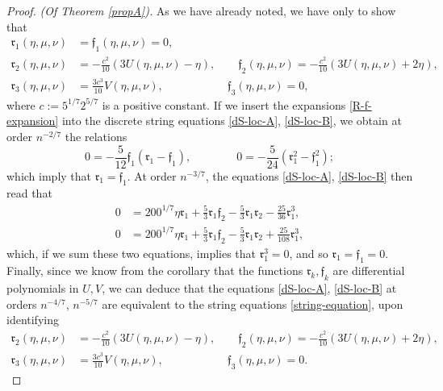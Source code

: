 \documentclass[usenames,dvipsnames]{article}
\theoremstyle{definition}
\numberwithin{equation}{section}
\numberwithin{figure}{section}
\begin{document}
\begin{proof}\textit{(Of Theorem \ref{propA}).}
As we have already noted, we have only to show that
                \begin{align*}
                    \mathfrak{r}_{1}(\eta,\mu,\nu) &= \mathfrak{f}_{1}(\eta,\mu,\nu) = 0,\\
                    \mathfrak{r}_{2}(\eta,\mu,\nu) &= -\frac{c^2}{10}\left(3U(\eta,\mu,\nu)-\eta\right),\qquad \mathfrak{f}_{2}(\eta,\mu,\nu) =  -\frac{c^2}{10}\left(3U(\eta,\mu,\nu)+2\eta\right),\\
                    \mathfrak{r}_{3}(\eta,\mu,\nu) &= \frac{3c^3}{10}V(\eta,\mu,\nu),\qquad\quad\,\,\,\,\qquad \mathfrak{f}_{3}(\eta,\mu,\nu) = 0,
                \end{align*}
where $c:=5^{1/7}2^{5/7}$ is a positive constant. If we insert the expansions \eqref{R-f-expansion} into the discrete string equations \eqref{dS-loc-A},
\eqref{dS-loc-B}, we obtain at order $n^{-2/7}$ the relations
    \begin{equation*}
        0  = -\frac{5}{12}\mathfrak{f}_1(\mathfrak{r}_1-\mathfrak{f}_1),\qquad\qquad 0 = -\frac{5}{24}(\mathfrak{r}_1^2-\mathfrak{f}_1^2);
    \end{equation*}
which imply that $\mathfrak{r}_1 = \mathfrak{f}_1$. At order $n^{-3/7}$, the equations \eqref{dS-loc-A}, \eqref{dS-loc-B} then read that
    \begin{align*}
        0 &= 200^{1/7}\eta \mathfrak{r}_1+\frac{5}{3}\mathfrak{r}_1\mathfrak{f}_2-\frac{5}{3}\mathfrak{r}_1\mathfrak{r}_2 - \frac{25}{36}\mathfrak{r}_1^3,\\
        0 &= 200^{1/7}\eta \mathfrak{r}_1+\frac{5}{3}\mathfrak{r}_1\mathfrak{f}_2-\frac{5}{3}\mathfrak{r}_1\mathfrak{r}_2 + \frac{25}{108}\mathfrak{r}_1^3,
    \end{align*}
which, if we sum these two equations, implies that $\mathfrak{r}_1^3 = 0$, and so $\mathfrak{r}_1 = \mathfrak{f}_1 = 0$. Finally, since we know from the corollary that the functions $\mathfrak{r}_k,\mathfrak{f}_k$ are differential polynomials in $U,V$, we can deduce that the equations \eqref{dS-loc-A}, \eqref{dS-loc-B} at orders $n^{-4/7}$, $n^{-5/7}$ are equivalent to the string equations \eqref{string-equation}, upon identifying
    \begin{align*}
        \mathfrak{r}_{2}(\eta,\mu,\nu) &= -\frac{c^2}{10}\left(3U(\eta,\mu,\nu)-\eta\right),\qquad \mathfrak{f}_{2}(\eta,\mu,\nu) =  -\frac{c^2}{10}\left(3U(\eta,\mu,\nu)+2\eta\right),\\
        \mathfrak{r}_{3}(\eta,\mu,\nu) &= \frac{3c^3}{10}V(\eta,\mu,\nu),\qquad\quad\,\,\,\,\qquad \mathfrak{f}_{3}(\eta,\mu,\nu) = 0.
    \end{align*}

\end{proof}
\end{document}
